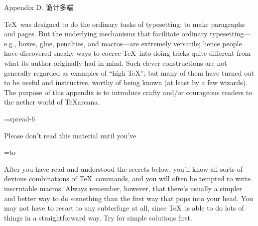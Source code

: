 


\beginchapter Appendix D. 诡计多端

\TeX\ was designed to do the ordinary tasks of typesetting: to make paragraphs
and pages. But the underlying mechanisms that facilitate ordinary
typesetting---e.g., boxes, glue, penalties, and macros---are extremely
versatile; hence people have discovered sneaky ways to coerce \TeX\ into
doing tricks quite different from what its author originally had in mind.
Such clever constructions are not generally regarded as examples of
``high \TeX''; but many of them have turned out to be useful and
instructive, worthy of being known (at least by a few wizards). The purpose
of this appendix is to introduce crafty and/or courageous readers
to the nether world of \TeX arcana.

\ninepoint\medskip
{}=\hbox spread-6\font %
 {\strut Please don't read this material until you've}
=\hbox to
\nointerlineskip
\noindent\strut After you have read and understood the secrets below, you'll
know all sorts of devious combinations of \TeX\ commands,
and you will often be tempted to write inscrutable macros. Always remember,
however, that there's usually a simpler and better way to do something
than the first way that pops into your head. You may not have to
resort to any subterfuge at all, since \TeX\ is able to do lots of things
in a straightforward way. Try for simple solutions first.

